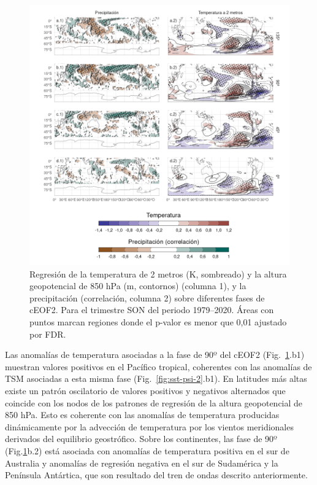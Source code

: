 \documentclass[12pt,oneside,a4paper]{reedthesis}
\begin{document}
\begin{figure}

{\centering \includegraphics{figures/20-ceofs/pp-temp-2-1} 

}

\caption{Regresión de la temperatura de 2 metros (K, sombreado) y la altura geopotencial de 850 hPa (m, contornos) (columna 1), y la precipitación (correlación, columna 2) sobre diferentes fases de cEOF2. Para el trimestre SON del periodo 1979--2020. Áreas con puntos marcan regiones donde el p-valor es menor que 0,01 ajustado por FDR.}\label{fig:pp-temp-2}
\end{figure}

Las anomalías de temperatura asociadas a la fase de 90º del cEOF2 (Fig.~\ref{fig:pp-temp-2}.b1) muestran valores positivos en el Pacífico tropical, coherentes con las anomalías de TSM asociadas a esta misma fase (Fig.~\ref{fig:sst-psi-2}.b1).
En latitudes más altas existe un patrón oscilatorio de valores positivos y negativos alternados que coincide con los nodos de los patrones de regresión de la altura geopotencial de 850 hPa.
Esto es coherente con las anomalías de temperatura producidas dinámicamente por la advección de temperatura por los vientos meridionales derivados del equilibrio geostrófico.
Sobre los continentes, las fase de 90º (Fig.\ref{fig:pp-temp-2}b.2) está asociada con anomalías de temperatura positiva en el sur de Australia y anomalías de regresión negativa en el sur de Sudamérica y la Península Antártica, que son resultado del tren de ondas descrito anteriormente.
\end{document}
